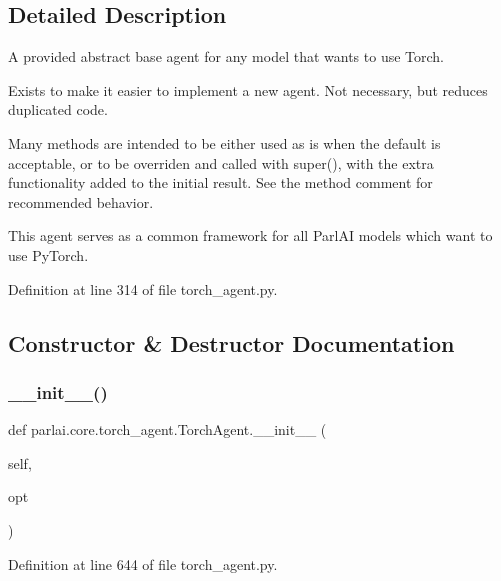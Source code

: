 \subsection{Detailed Description}
\begin{DoxyVerb}A provided abstract base agent for any model that wants to use Torch.

Exists to make it easier to implement a new agent.
Not necessary, but reduces duplicated code.

Many methods are intended to be either used as is when the default is
acceptable, or to be overriden and called with super(), with the extra
functionality added to the initial result. See the method comment for
recommended behavior.

This agent serves as a common framework for all ParlAI models which want
to use PyTorch.
\end{DoxyVerb}
 

Definition at line 314 of file torch\+\_\+agent.\+py.



\subsection{Constructor \& Destructor Documentation}
\mbox{\label{classparlai_1_1core_1_1torch__agent_1_1TorchAgent_afc9c818413b776a498c2bcc0bfe3c6f7}} 
\subsubsection{\texorpdfstring{\+\_\+\+\_\+init\+\_\+\+\_\+()}{\_\_init\_\_()}}
{\footnotesize\ttfamily def parlai.\+core.\+torch\+\_\+agent.\+Torch\+Agent.\+\_\+\+\_\+init\+\_\+\+\_\+ (\begin{DoxyParamCaption}\item[{}]{self,  }\item[{}]{opt }\end{DoxyParamCaption})}



Definition at line 644 of file torch\+\_\+agent.\+py.


